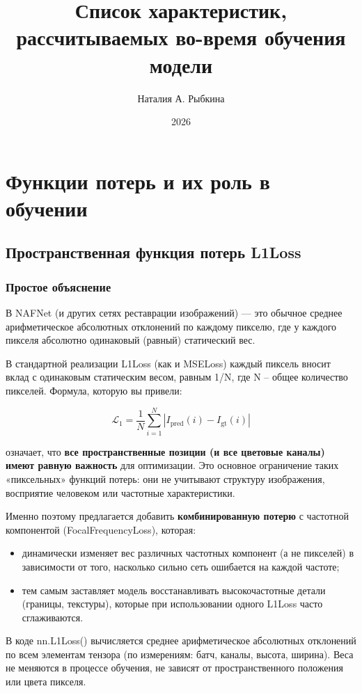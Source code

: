 \documentclass[12pt,a4paper]{article}
\title{Список характеристик, рассчитываемых во-время обучения модели}
\author{Наталия А. Рыбкина}
\date{2026}
\begin{document}
\maketitle

\section{Функции потерь и их роль в обучении}

\subsection{Пространственная функция потерь L1Loss}

\subsubsection{Простое объяснение}

В NAFNet (и других сетях реставрации изображений) — это обычное среднее арифметическое абсолютных отклонений по каждому пикселю, где у каждого пикселя абсолютно одинаковый (равный) статический вес. 

В стандартной реализации L1Loss (как и MSELoss) каждый пиксель вносит вклад с одинаковым статическим весом, равным 1/N, где N – общее количество пикселей. Формула, которую вы привели:

\[
\mathcal{L}_1 = \frac{1}{N}\sum_{i=1}^N |I_{\text{pred}}(i) - I_{\text{gt}}(i)|
\]

означает, что \textbf{все пространственные позиции (и все цветовые каналы) имеют равную важность} для оптимизации. Это основное ограничение таких «пиксельных» функций потерь: они не учитывают структуру изображения, восприятие человеком или частотные характеристики.  

Именно поэтому предлагается добавить \textbf{комбинированную потерю} с частотной компонентой (FocalFrequencyLoss), которая:

\begin{itemize}
    \item динамически изменяет вес различных частотных компонент (а не пикселей) в зависимости от того, насколько сильно сеть ошибается на каждой частоте;
    \item тем самым заставляет модель восстанавливать высокочастотные детали (границы, текстуры), которые при использовании одного L1Loss часто сглаживаются.
\end{itemize}

В коде nn.L1Loss() вычисляется среднее арифметическое абсолютных отклонений по всем элементам тензора (по измерениям: батч, каналы, высота, ширина). Веса не меняются в процессе обучения, не зависят от пространственного положения или цвета пикселя.
\end{document}
